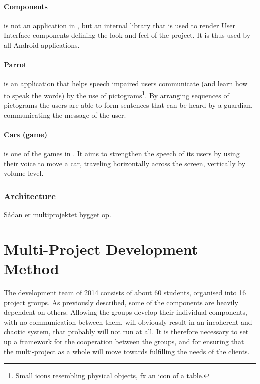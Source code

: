 \paragraph{\giraf Components}
is not an application in \giraf, but an internal library that is used to render User Interface components defining the look and feel of the project.
It is thus used by all Android applications.

\paragraph{Parrot}
is an application that helps speech impaired users communicate (and learn how to speak the words) by the use of pictograms\footnote{Small icons resembling physical objects, fx an icon of a table.}.
By arranging sequences of pictograms the users are able to form sentences that can be heard by a guardian, communicating the message of the user.

\paragraph{Cars (game)}
is one of the games in \giraf.
It aims to strengthen the speech of its users by using their voice to move a car, traveling horizontally across the screen, vertically by volume level.


\subsubsection{Architecture}

Sådan er multiprojektet bygget op.


\section{Multi-Project Development Method}\label{sec:giraf:development}
The \giraf development team of 2014 consists of about 60 students, organised into 16 project groups. 
As previously described, some of the \giraf components are heavily dependent on others. 
Allowing the groups develop their individual components, with no communication between them, will obviously result in an incoherent and chaotic system, that probably will not run at all. 
It is therefore necessary to set up a framework for the cooperation between the groups, and for ensuring that the multi-project as a whole will move towards fulfilling the needs of the clients.

